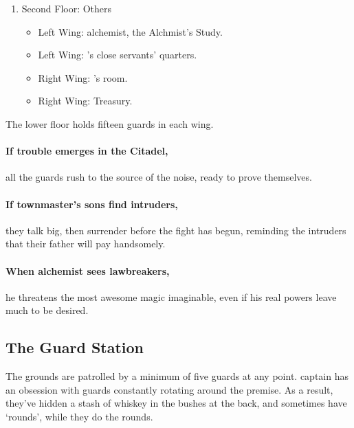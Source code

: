 \begin{multicols}{2}
\begin{enumerate}
  \item
  Second Floor: Others
    \begin{itemize}
      \item
      Left Wing: \gls{alchemist}, the Alchmist's Study.
      \item
      Left Wing: 's close servants' quarters.
      \item
      Right Wing: 's room.
      \item
      Right Wing: Treasury.
    \end{itemize}

\end{enumerate}

The lower floor holds fifteen guards in each wing.


\paragraph{If trouble emerges in the Citadel,}
all the guards rush to the source of the noise, ready to prove themselves.


\paragraph{If \gls{townmaster}'s sons find intruders,}
they talk big, then surrender before the fight has begun, reminding the intruders that their father will pay handsomely.

\citadelAlchemist

\label{citadel_alchemist}

\paragraph{When \gls{alchemist} sees lawbreakers,}
he threatens the most awesome magic imaginable, even if his real powers leave much to be desired.

\townmaster

\subsection{The Guard Station}\label{guardstation}
The grounds are patrolled by a minimum of five guards at any point.
\Gls{captain} has an obsession with guards constantly rotating around the premise.
As a result, they've hidden a stash of whiskey in the bushes at the back, and sometimes have `rounds', while they do the rounds.


\end{multicols}

